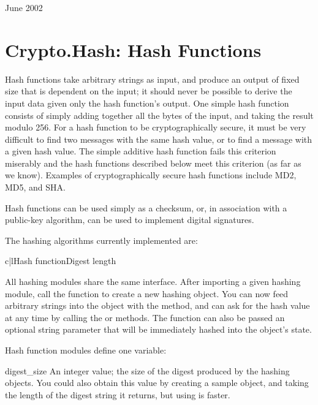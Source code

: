 \documentclass{howto}
\begin{document}
June 2002


\section{Crypto.Hash: Hash Functions}

Hash functions take arbitrary strings as input, and produce an output
of fixed size that is dependent on the input; it should never be
possible to derive the input data given only the hash function's
output.  One simple hash function consists of simply adding together
all the bytes of the input, and taking the result modulo 256.  For a
hash function to be cryptographically secure, it must be very
difficult to find two messages with the same hash value, or to find a
message with a given hash value.  The simple additive hash function
fails this criterion miserably and the hash functions described below
meet this criterion (as far as we know).  Examples of
cryptographically secure hash functions include MD2, MD5, and SHA.

Hash functions can be used simply as a checksum, or, in association with a
public-key algorithm, can be used to implement digital signatures.
 
The hashing algorithms currently implemented are:

\begin{tableii}{c|l}{}{Hash function}{Digest length}
\end{tableii}

All hashing modules share the same interface.  After importing a given
hashing module, call the  function to create a new
hashing object. You can now feed arbitrary strings into the object
with the  method, and can ask for the hash value at
any time by calling the  or 
methods.  The  function can also be passed an optional
string parameter that will be immediately hashed into the object's
state.

Hash function modules define one variable:

\begin{datadesc}{digest_size}
An integer value; the size of the digest
produced by the hashing objects.  You could also obtain this value by
creating a sample object, and taking the length of the digest string
it returns, but using  is faster.
\end{datadesc}
\end{document}

